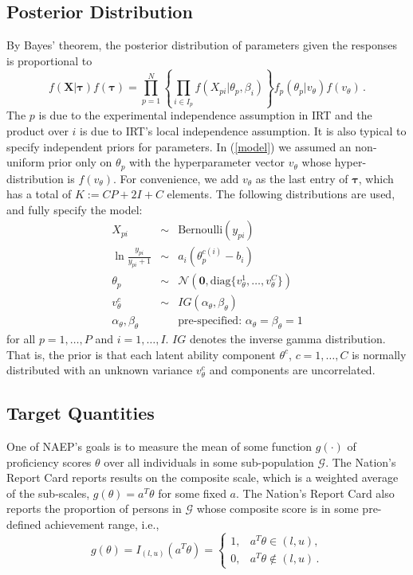 \documentclass{article}
\newcommand{\Normal}{\mathcal{N}}
\newcommand{\G}{\mathcal{G}}
\newcommand{\bX}{\mathbf{X}}
\newcommand{\bt}{\boldsymbol\tau}
\newcommand{\st}{v_{\ta}}
\newcommand{\ta}{\theta}
\begin{document}
\subsection{Posterior Distribution}
By Bayes' theorem, the posterior distribution of parameters given the responses is proportional to
\begin{equation}
  f(\bX|\bt) f(\bt) = \prod_{p=1}^N \left\{ \prod_{i \in I_p} f(X_{pi}|\ta_p,\beta_i) \right\} f_p(\ta_p|\st) f(\st)\,.
  \label{model}
\end{equation}
The $p$ is due to the experimental independence assumption in IRT and the product over $i$ is due to IRT’s local independence assumption. It is also typical to specify independent priors for parameters. In (\ref{model}) we assumed an non-uniform prior only on $\ta_p$ with the hyperparameter vector $\st$ whose hyper-distribution is $f(\st)$. For convenience, we add $\st$ as the last entry of $\bt$, which has a total of $K := C P + 2 I + C$ elements. The following distributions are used, and fully specify the model:
\begin{eqnarray}
	X_{pi} &\sim& {\mbox{Bernoulli}}(y_{pi})
	\label{dist_x} \\
	\ln \frac{y_{pi}}{y_{pi}+1} &\sim& a_i (\ta_{p}^{c(i)} - b_i)
	\label{dist_y} \\
	\ta_p &\sim& \Normal(\mathbf{0}, {\mbox{diag}}\{\st^1,\dots,\st^C\}) 
	\label{dist_ta} \\
	\st^c &\sim& IG(\alpha_{\ta}, \beta_{\ta})
	\label{dist_st} \\
	\alpha_{\ta}, \beta_{\ta} && {\mbox{pre-specified: }} \alpha_{\ta} = \beta_{\ta} = 1
	\label{dist_ab}
\end{eqnarray}
for all $p=1,\dots,P$ and $i=1,\dots,I$. $IG$ denotes the inverse gamma distribution. That is, the prior is that each latent ability component $\ta^c$, $c=1,\dots,C$ is normally distributed with an unknown variance $\st^c$ and components are uncorrelated.

\subsection{Target Quantities}
One of NAEP's goals is to measure the mean of some function $g(\cdot)$ of proficiency scores $\ta$ over all individuals in some sub-population $\G$. The Nation's Report Card reports results on the composite scale, which is a weighted average of the sub-scales, $g(\ta) = a^T \ta$ for some fixed $a$. The Nation's Report Card also reports the proportion of persons in $\G$ whose composite score is in some pre-defined achievement range, i.e.,
\begin{equation}
	g(\ta) = I_{(l,u)}(a^T \ta) =
  \begin{cases}
    1, & a^T \ta \in (l,u), \\
    0, & a^T \ta \not \in (l,u)\,.
  \end{cases}
\end{equation}
\end{document}

